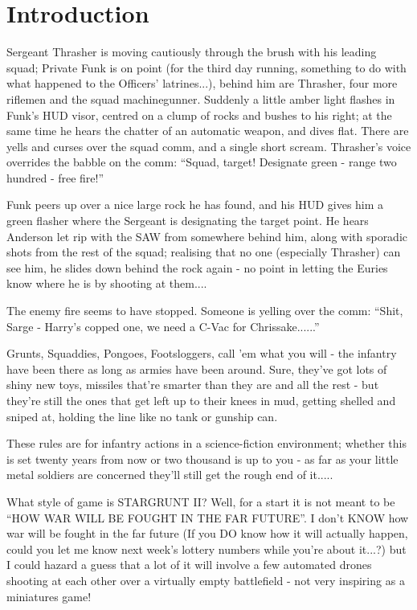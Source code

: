 \chapter{Introduction}
\begin{itshape}
Sergeant Thrasher is moving cautiously through the brush with his leading squad; Private Funk is on point (for the third day running, something to do with what happened to the Officers' latrines...), behind him are Thrasher, four more riflemen and the squad machinegunner. Suddenly a little amber light flashes in Funk's HUD visor, centred on a clump of rocks and bushes to his right; at the same time he hears the chatter of an automatic weapon, and dives flat. There are yells and curses over the squad comm, and a single short scream. Thrasher's voice overrides the babble on the comm: ``Squad, target! Designate green - range two hundred - free fire!''

Funk peers up over a nice large rock he has found, and his HUD gives him a green flasher where the Sergeant is designating the target point. He hears Anderson let rip with the SAW from somewhere behind him, along with sporadic shots from the rest of the squad; realising that no one (especially Thrasher) can see him, he slides down behind the rock again - no point in letting the Euries know where he is by shooting at them....

The enemy fire seems to have stopped. Someone is yelling over the comm: ``Shit, Sarge - Harry's copped one, we need a C-Vac for Chrissake......'' 
\end{itshape}

Grunts, Squaddies, Pongoes, Footsloggers, call 'em what you will - the infantry have been there as long as armies have been around. Sure, they've got lots of shiny new toys, missiles that're smarter than they are and all the rest - but they're still the ones that get left up to their knees in mud, getting shelled and sniped at, holding the line like no tank or gunship can.

These rules are for infantry actions in a science-fiction environment; whether this is set twenty years from now or two thousand is up to you - as far as your little metal soldiers are concerned they'll still get the rough end of it..... 

What style of game is STARGRUNT II? Well, for a start it is not meant to be ``HOW WAR WILL BE FOUGHT IN THE FAR FUTURE''. I don't KNOW how war will be fought in the far future (If you DO know how it will actually happen, could you let me know next week's lottery numbers while you're about it...?) but I could hazard a guess that a lot of it will involve a few automated drones shooting at each other over a virtually empty battlefield - not very inspiring as a miniatures game!

